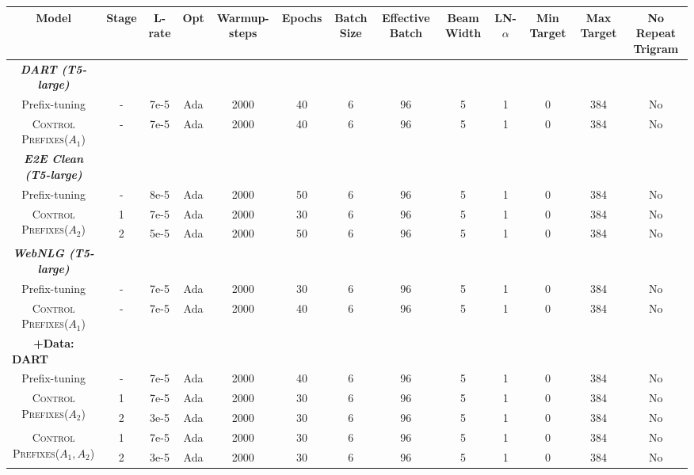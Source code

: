 \documentclass[11pt]{article}
\newcommand{\control}{\textsc{Control Prefixes}\xspace}
\begin{document}
\begin{table*}[htb!]
\scriptsize
\centering
  \begin{adjustbox}{max width=\textwidth}{
  \begin{tabular}{ccccccccccccc}

    Model &  Stage & L-rate & Opt & Warmup-steps & Epochs  & Batch Size & Effective Batch & Beam Width & LN-$\alpha$ & Min Target & Max Target & No Repeat Trigram\\\toprule
        \multicolumn{1}{c}{\it \textbf{DART (T5-large)}} \\
        \midrule
        \scriptsize{Prefix-tuning}   & - & 7e-5 & Ada & 2000  & 40 & 6 & 96 & 5 & 1 & 0 & 384 & No\\
    \scriptsize{\control ($A_{1}$)}   & - & 7e-5 & Ada & 2000  & 40 & 6 & 96 & 5 & 1 & 0 & 384 & No\\
    \midrule
    \multicolumn{1}{c}{\it \textbf{E2E Clean (T5-large)}}\\

\midrule
    \scriptsize{Prefix-tuning}   &  - & 8e-5 & Ada & 2000  & 50 & 6 & 96 & 5 & 1 & 0 & 384 & No\\
    \multirow{2}{*}{\scriptsize{\control ($A_{2}$)}} & 1 & 7e-5 & Ada & 2000  & 30 & 6 & 96 & 5 & 1 & 0 & 384 & No\\ & 2 & 5e-5 & Ada & 2000  & 50 & 6 & 96 & 5 & 1 & 0 & 384 & No\\
    
\midrule
    
    \multicolumn{1}{c}{\it \textbf{WebNLG (T5-large)}} \\
    \midrule

    
  \scriptsize{Prefix-tuning} & - & 7e-5 & Ada & 2000  & 30 & 6 & 96 & 5 & 1 & 0 & 384 & No\\
      \scriptsize{\control ($A_{1}$)}   & - & 7e-5 & Ada & 2000  & 40 & 6 & 96 & 5 & 1 & 0 & 384 & No\\
     \midrule
    \multicolumn{1}{l}{\scriptsize{\textbf{$\; \; \; \; \; \; \;$+Data: DART}}} \\
 


    \scriptsize{Prefix-tuning}   & - & 7e-5 & Ada & 2000  & 40 & 6 & 96 & 5 & 1 & 0 & 384 & No\\
    \multirow{2}{*}{\scriptsize{\control ($A_{2}$)}} & 1 & 7e-5 & Ada & 2000  & 30 & 6 & 96 & 5 & 1 & 0 & 384 & No\\ & 2 & 3e-5 & Ada & 2000  & 30 & 6 & 96 & 5 & 1 & 0 & 384 & No\\
      \multirow{2}{*}{\scriptsize{\control ($A_{1},A_{2}$)}} & 1 & 7e-5 & Ada & 2000  & 30 & 6 & 96 & 5 & 1 & 0 & 384 & No\\ & 2 & 3e-5 & Ada & 2000  & 30 & 6 & 96 & 5 & 1 & 0 & 384 & No\\
 




\end{tabular}}
\end{adjustbox}
\end{table*}
\end{document}
